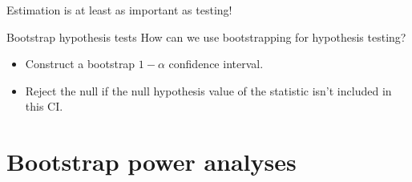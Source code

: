 \documentclass{beamer} %
\begin{document}
\begin{frame}[standout]
Estimation is at least as important as testing! 
\end{frame}

\begin{frame}{Bootstrap hypothesis tests}
How can we use bootstrapping for hypothesis testing?
\begin{itemize}[<+(1)->]
\item Construct a bootstrap $1-\alpha$ confidence interval.
\item Reject the null if the null hypothesis value of the statistic isn't included in this CI.
\end{itemize}
\end{frame}



\section{Bootstrap power analyses}
\end{document}
